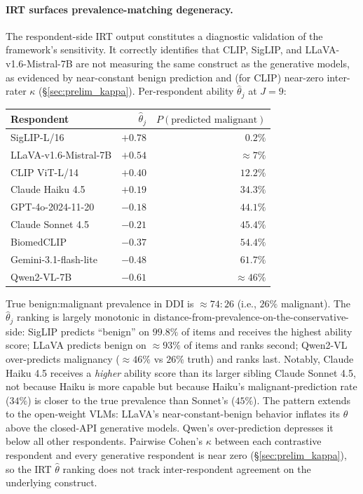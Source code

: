 \documentclass{article}
\begin{document}
\paragraph{IRT surfaces prevalence-matching degeneracy.}
\label{sec:prelim_irt_degeneracy}
The respondent-side IRT output constitutes a diagnostic validation of the framework's sensitivity. It correctly identifies that CLIP, SigLIP, and LLaVA-v1.6-Mistral-7B are not measuring the same construct as the generative models, as evidenced by near-constant benign prediction and (for CLIP) near-zero inter-rater $\kappa$ (\S\ref{sec:prelim_kappa}). Per-respondent ability $\hat\theta_j$ at $J = 9$:
\begin{center}
\small
\begin{tabular}{lrr}
\toprule
Respondent & $\hat\theta_j$ & $P(\text{predicted malignant})$ \\
\midrule
SigLIP-L/16           & $+0.78$ & $0.2\%$ \\
LLaVA-v1.6-Mistral-7B & $+0.54$ & $\approx 7\%$ \\
CLIP ViT-L/14         & $+0.40$ & $12.2\%$ \\
Claude Haiku 4.5      & $+0.19$ & $34.3\%$ \\
GPT-4o-2024-11-20     & $-0.18$ & $44.1\%$ \\
Claude Sonnet 4.5     & $-0.21$ & $45.4\%$ \\
BiomedCLIP            & $-0.37$ & $54.4\%$ \\
Gemini-3.1-flash-lite & $-0.48$ & $61.7\%$ \\
Qwen2-VL-7B           & $-0.61$ & $\approx 46\%$ \\
\bottomrule
\end{tabular}
\end{center}
True benign:malignant prevalence in DDI is $\approx 74{:}26$ (i.e., $26\%$ malignant). The $\hat\theta_j$ ranking is largely monotonic in distance-from-prevalence-on-the-conservative-side: SigLIP predicts ``benign'' on $99.8\%$ of items and receives the highest ability score; LLaVA predicts benign on $\approx 93\%$ of items and ranks second; Qwen2-VL over-predicts malignancy ($\approx 46\%$ vs $26\%$ truth) and ranks last. Notably, Claude Haiku 4.5 receives a \emph{higher} ability score than its larger sibling Claude Sonnet 4.5, not because Haiku is more capable but because Haiku's malignant-prediction rate ($34\%$) is closer to the true prevalence than Sonnet's ($45\%$). The pattern extends to the open-weight VLMs: LLaVA's near-constant-benign behavior inflates its $\hat\theta$ above the closed-API generative models. Qwen's over-prediction depresses it below all other respondents. Pairwise Cohen's $\kappa$ between each contrastive respondent and every generative respondent is near zero (\S\ref{sec:prelim_kappa}), so the IRT $\hat\theta$ ranking does not track inter-respondent agreement on the underlying construct.
\end{document}

